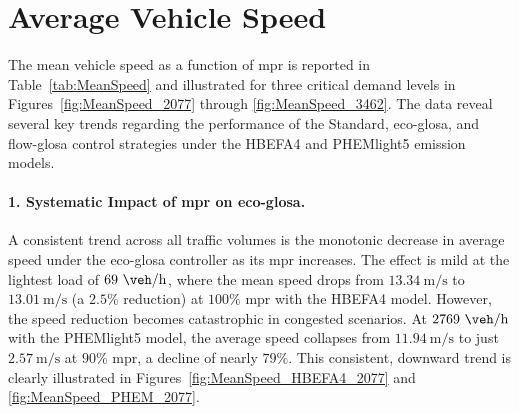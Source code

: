 \section{Average Vehicle Speed}
\label{sec:Results_MeanSpeed}

The mean vehicle speed as a function of \ac{mpr} is reported in Table~\vref{tab:MeanSpeed} and illustrated for three critical demand levels in Figures~\vref{fig:MeanSpeed_2077} through \vref{fig:MeanSpeed_3462}. The data reveal several key trends regarding the performance of the Standard, \ac{eco-glosa}, and \ac{flow-glosa} control strategies under the HBEFA4 and PHEMlight5 emission models.

\paragraph{1. Systematic Impact of \ac{mpr} on \ac{eco-glosa}.}
A consistent trend across all traffic volumes is the monotonic decrease in average speed under the \ac{eco-glosa} controller as its \ac{mpr} increases. The effect is mild at the lightest load of $69~\unit{\veh\per\hour}$, where the mean speed drops from $13.34~\unit{\metre\per\second}$ to $13.01~\unit{\metre\per\second}$ (a $2.5\%$ reduction) at $100\%$ \ac{mpr} with the HBEFA4 model. However, the speed reduction becomes catastrophic in congested scenarios. At $2769~\unit{\veh\per\hour}$ with the PHEMlight5 model, the average speed collapses from $11.94~\unit{\metre\per\second}$ to just $2.57~\unit{\metre\per\second}$ at $90\%$ \ac{mpr}, a decline of nearly $79\%$. This consistent, downward trend is clearly illustrated in Figures~\vref{fig:MeanSpeed_HBEFA4_2077} and \vref{fig:MeanSpeed_PHEM_2077}.

